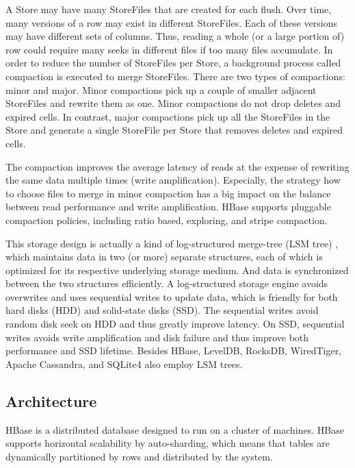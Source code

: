 \documentclass[11pt]{book}
\begin{document}
A Store may have many StoreFiles that are created for each flush. Over time, many versions of a row may exist in different StoreFiles. Each of these versions may have different sets of columns. Thus, reading a whole (or a large portion of) row could require many seeks in different files if too many files accumulate. In order to reduce the number of StoreFiles per Store, a background process called compaction is executed to merge StoreFiles. There are two types of compactions: minor and major. Minor compactions pick up a couple of smaller adjacent StoreFiles and rewrite them as one. Minor compactions do not drop deletes and expired cells. In contrast, major compactions pick up all the StoreFiles in the Store and generate a single StoreFile per Store that removes deletes and expired cells.

The compaction improves the average latency of reads at the expense of rewriting the same data multiple times (write amplification). Especially, the strategy how to choose files to merge in minor compaction has a big impact on the balance between read performance and write amplification. HBase supports pluggable compaction policies, including ratio based, exploring, and stripe compaction.

This storage design is actually a kind of log-structured merge-tree (LSM tree) \cite{O'Neil96thelog-structured}, which maintains data in two (or more) separate structures, each of which is optimized for its respective underlying storage medium. And data is synchronized between the two structures efficiently. A log-structured storage engine avoids overwrites and uses sequential writes to update data, which is friendly for both hard disks (HDD) and solid-state disks (SSD). The sequential writes avoid random disk seek on HDD and thus greatly improve latency. On SSD, sequential writes avoids write amplification and disk failure and thus improve both performance and SSD lifetime. Besides HBase,  LevelDB, RocksDB, WiredTiger, Apache Cassandra, and SQLite4 also employ LSM trees.

\subsection{Architecture}

HBase is a distributed database designed to run on a cluster of machines. HBase supports horizontal scalability by auto-sharding, which means that tables are dynamically partitioned by rows and distributed by the system. 
\end{document}

